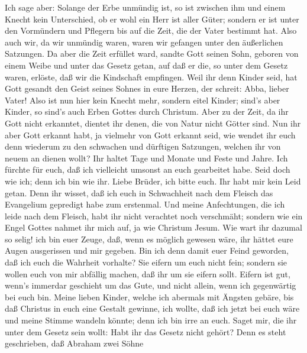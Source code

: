 Ich sage aber: Solange der Erbe unmündig ist, so ist
zwischen ihm und einem Knecht kein Unterschied, ob er wohl ein Herr ist
aller Güter;  sondern er ist unter den Vormündern und
Pflegern bis auf die Zeit, die der Vater bestimmt hat.  Also
auch wir, da wir unmündig waren, waren wir gefangen unter den
äußerlichen Satzungen.  Da aber die Zeit erfüllet ward,
sandte Gott seinen Sohn, geboren von einem Weibe und unter das Gesetz
getan,  auf daß er die, so unter dem Gesetz waren, erlöste,
daß wir die Kindschaft empfingen.  Weil ihr denn Kinder
seid, hat Gott gesandt den Geist seines Sohnes in eure Herzen, der
schreit: Abba, lieber Vater!  Also ist nun hier kein Knecht
mehr, sondern eitel Kinder; sind's aber Kinder, so sind's auch Erben
Gottes durch Christum.  Aber zu der Zeit, da ihr Gott nicht
erkanntet, dientet ihr denen, die von Natur nicht Götter sind.
 Nun ihr aber Gott erkannt habt, ja vielmehr von Gott
erkannt seid, wie wendet ihr euch denn wiederum zu den schwachen und
dürftigen Satzungen, welchen ihr von neuem an dienen wollt?
 Ihr haltet Tage und Monate und Feste und Jahre.
 Ich fürchte für euch, daß ich vielleicht umsonst an euch
gearbeitet habe.  Seid doch wie ich; denn ich bin wie ihr.
Liebe Brüder, ich bitte euch. Ihr habt mir kein Leid getan.
 Denn ihr wisset, daß ich euch in Schwachheit nach dem
Fleisch das Evangelium gepredigt habe zum erstenmal.  Und
meine Anfechtungen, die ich leide nach dem Fleisch, habt ihr nicht
verachtet noch verschmäht; sondern wie ein Engel Gottes nahmet ihr mich
auf, ja wie Christum Jesum.  Wie wart ihr dazumal so selig!
ich bin euer Zeuge, daß, wenn es möglich gewesen wäre, ihr hättet eure
Augen ausgerissen und mir gegeben.  Bin ich denn damit euer
Feind geworden, daß ich euch die Wahrheit vorhalte?  Sie
eifern um euch nicht fein; sondern sie wollen euch von mir abfällig
machen, daß ihr um sie eifern sollt.  Eifern ist gut,
wenn's immerdar geschieht um das Gute, und nicht allein, wenn ich
gegenwärtig bei euch bin.  Meine lieben Kinder, welche ich
abermals mit Ängsten gebäre, bis daß Christus in euch eine Gestalt
gewinne,  ich wollte, daß ich jetzt bei euch wäre und meine
Stimme wandeln könnte; denn ich bin irre an euch.  Saget
mir, die ihr unter dem Gesetz sein wollt: Habt ihr das Gesetz nicht
gehört?  Denn es steht geschrieben, daß Abraham zwei Söhne
